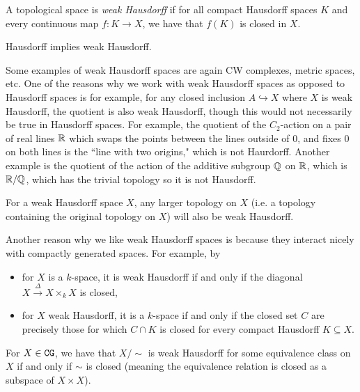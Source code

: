 \documentclass{article}[11pt]
\begin{document}
\begin{definition} A topological space is \textit{weak Hausdorff} if for all compact Hausdorff spaces $K$ and every continuous map $f: K \to X$, we have that $f(K)$ is closed in $X$.
\end{definition}

\begin{exercise} Hausdorff implies weak Hausdorff.
\end{exercise}

Some examples of weak Hausdorff spaces are again CW complexes, metric spaces, etc. One of the reasons why we work with weak Hausdorff spaces as opposed to Hausdorff spaces is for example, for any closed inclusion $A\hookrightarrow X$ where $X$ is weak Hausdorff, the quotient is also weak Hausdorff, though this would not necessarily be true in Hausdorff spaces.  For example, the quotient of the $C_2$-action on a pair of real lines $\mathbb{R}$ which swaps the points between the lines outside of 0, and fixes $0$ on both lines is the ``line with two origins," which is not Haurdorff. Another example is the quotient of the action of the additive subgroup $\mathbb{Q}$ on $\mathbb{R}$, which is $\mathbb{R}/\mathbb{Q}$, which has the trivial topology so it is not Hausdorff.

\begin{proposition} For a weak Hausdorff space $X$, any larger topology on $X$ (i.e. a topology containing the original topology on $X$) will also be weak Hausdorff.
\end{proposition}

Another reason why we like weak Hausdorff spaces is because they interact nicely with compactly generated spaces. For example, by \cite[Lemma 1.4. and Proposition 2.14]{Strickland-cgwh}
\vspace{-1em}
\begin{itemize}\itemsep=0em
\item for $X$ is a $k$-space, it is weak Hausdorff if and only if the diagonal $X\xrightarrow{\Delta} X\times_k X$ is closed,
\item for $X$ weak Hausdorff, it is a $k$-space if and only if the closed set $C$ are precisely those for which $C\cap K$ is closed for every compact Hausdorff $K\subseteq X.$
\end{itemize}

\begin{proposition} For $X \in \texttt{CG}$, we have that $X\Big/\sim$ is weak Hausdorff for some equivalence class on $X$ if and only if $\sim$ is closed (meaning the equivalence relation is closed as a subspace of $X\times X$).
\end{proposition}
\end{document}
